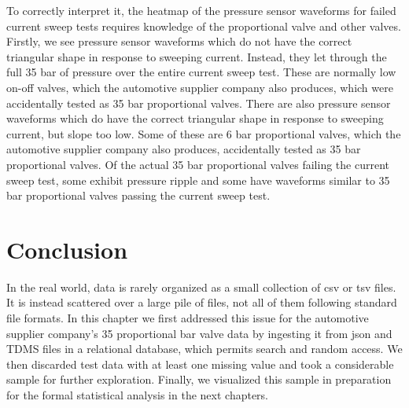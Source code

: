 To correctly interpret it, the heatmap of the pressure sensor waveforms for failed current sweep tests requires knowledge of the proportional valve and other valves.
Firstly, we see pressure sensor waveforms which do not have the correct triangular shape in response to sweeping current.
Instead, they let through the full 35 bar of pressure over the entire current sweep test.
These are normally low on-off valves, which the automotive supplier company also produces, which were accidentally tested as 35 bar proportional valves.
There are also pressure sensor waveforms which do have the correct triangular shape in response to sweeping current, but slope too low.
Some of these are 6 bar proportional valves, which the automotive supplier company also produces, accidentally tested as 35 bar proportional valves.
Of the actual 35 bar proportional valves failing the current sweep test, some exhibit pressure ripple and some have waveforms similar to 35 bar proportional valves passing the current sweep test.

\section{Conclusion}

In the real world, data is rarely organized as a small collection of \acrshort{csv} or \acrshort{tsv} files.
It is instead scattered over a large pile of files, not all of them following standard file formats.
In this chapter we first addressed this issue for the automotive supplier company's 35 proportional bar valve data by ingesting it from \acrshort{json} and TDMS files in a relational database, which permits search and random access.
We then discarded test data with at least one missing value and took a considerable sample for further exploration.
Finally, we visualized this sample in preparation for the formal statistical analysis in the next chapters.
